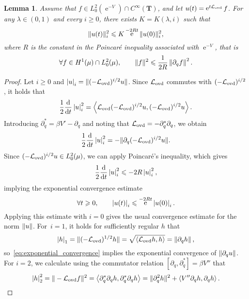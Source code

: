 \documentclass[11pt,a4paper]{article}
\DeclareMathOperator{\e}{e}
\newcommand{\commut}[2]{[#1, #2]}
\newcommand{\torus}{\mathbf T}
\theoremstyle{plain}
\newtheorem{lemma}{Lemma}[section]
\numberwithin{equation}{section}
\renewcommand{\leq}{\leqslant}
\renewcommand{\geq}{\geqslant}
\begin{document}
\begin{lemma}
    \label{lemma:overdamped_langevin_decay_derivatives}
    Assume that $f \in L^2_0(\e^{-V}) \cap C^{\infty}(\torus)$,
    and let $u(t) = \e^{t \mathcal L_{\rm ovd}} f$.
    For any $\lambda \in (0, 1)$ and every $i \geq 0$,
    there exists $K = K(\lambda, i)$ such that
    \[
        \norm*{u(t)}_i^2 \leq K \e^{- 2 R t} \norm*{u(0)}_i^2,
    \]
    where $R$ is the constant in the Poincaré inequality associated with $\e^{-V}$,
    that is
    \[
        \forall f \in H^1(\mu) \cap L^2_0(\mu), \qquad
        \norm*{f}^2 \leq \frac{1}{2R} \norm{\partial_q f}^2.
    \]
\end{lemma}
\begin{proof}
    Let $i \geq 0$ and $\seminorm{u}_i = \norm*{(- \mathcal L_{\rm ovd})^{i/2} u}$.
    Since $\mathcal L_{\rm ovd}$ commutes with $(-\mathcal L_{\rm ovd})^{i/2}$,
    it holds that
    \[
        \frac{1}{2} \derivative*{1}{t} \seminorm{u}_i^2 = \ip{\mathcal L_{\rm ovd} (-\mathcal L_{\rm ovd})^{i/2} u}{(- \mathcal L_{\rm ovd})^{i/2} u}.
    \]
    Introducing $\partial_q^* = \beta V' - \partial_q$
    and noting that $\mathcal L_{\rm ovd} = - \partial_q^* \partial_q$,
    we obtain
    \[
        \frac{1}{2} \derivative*{1}{t} \seminorm{u}_i^2 = - \norm*{\partial_q (-\mathcal L_{\rm ovd})^{i/2} u}.
    \]
    Since $(-\mathcal L_{\rm ovd})^{i/2} u \in L^2_0(\mu)$,
    we can apply Poincar\'e's inequality, which gives
    \[
        \frac{1}{2} \derivative*{1}{t} \seminorm{u}_i^2 \leq - 2R \seminorm{u}_i^2,
    \]
    implying the exponential convergence estimate
    \begin{equation}
        \label{eq:exponential_convergence}
        \forall t \geq 0, \qquad
        \seminorm{u(t)}_i \leq \e^{- 2 R t} \seminorm{u(0)}_i.
    \end{equation}
    Applying this estimate with $i = 0$ gives the usual convergence estimate for the norm $\norm{u}$.
    For~$i = 1$, it holds for sufficiently regular $h$ that
    \[
        \seminorm{h}_1 = \norm*{(- \mathcal L_{\rm ovd})^{1/2} h} = \sqrt{\ip{\mathcal L_{\rm ovd} h}{h}} = \norm{\partial_q h},
    \]
    so~\eqref{eq:exponential_convergence} implies the exponential convergence of $\norm{\partial_q u}$.
    For $i = 2$, we calculate using the commutator relation $\commut{\partial_q}{\partial_q^*} = \beta V''$ that
    \[
        \seminorm{h}_2^2 = \norm*{- \mathcal L_{\rm ovd}f}^2
        = \ip{\partial_q^* \partial_q h}{\partial_q^* \partial_q h}
        = \norm*{\partial_q^2 h}^2 + \ip{V'' \partial_q h}{\partial_q h}.
\]
\end{proof}
\end{document}
